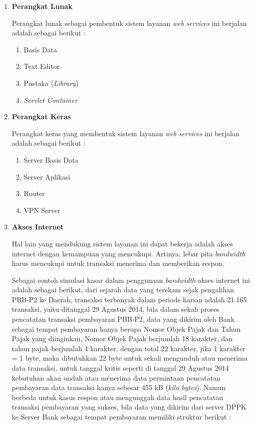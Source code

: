 \documentclass[pdftex,12pt, oneside]{article}
\begin{document}
\begin{enumerate}

\item \textbf{Perangkat Lunak}

Perangkat lunak sebagai pembentuk sistem layanan \textit{web services} ini berjalan adalah sebagai berikut :

\begin{enumerate}
  \item Basis Data
  
  
  
  \item Text Editor 
  \item Pustaka (\textit{Library})
  \item \textit{Servlet Container}
\end{enumerate}

\item \textbf{Perangkat Keras}

Perangkat keras yang membentuk sistem layanan \textit{web services} ini berjalan adalah sebagai berikut :

\begin{enumerate}
  \item Server Basis Data
  \item Server Aplikasi
  \item Router
  \item VPN Server
\end{enumerate}

\item \textbf{Akses Internet}

Hal lain yang mendukung sistem layanan ini dapat bekerja adalah akses internet dengan kemampuan yang mencukupi. Artinya, lebar pita \textit{bandwidth} harus mencukupi untuk transaksi menerima dan memberikan respon.

Sebagai contoh simulasi kasar dalam penggunaan \textit{bandwidth} akses internet ini adalah sebagai berikut, dari sejarah data yang terekam sejak pengalihan PBB-P2 ke Daerah, transaksi terbanyak dalam periode harian adalah 21.165 transaksi, yaitu ditanggal 29 Agustus 2014, bila dalam sekali proses pencatatan transaksi pembayaran PBB-P2, data yang dikirim oleh Bank sebagai tempat pembayaran hanya berupa Nomor Objek Pajak dan Tahun Pajak yang diinginkan, Nomor Objek Pajak berjumlah 18 karakter, dan tahun pajak berjumlah 4 karakter, dengan total 22 karakter, jika 1 karakter = 1 byte, maka dibutuhkan 22 byte untuk sekali mengunduh atau menerima data transaksi, untuk tanggal kritis seperti di tanggal 29 Agustus 2014 kebutuhan akan unduh atau menerima data permintaan pencatatan pembayaran data transaksi hanya sebesar 455 kB (\textit{kilo bytes}). Namun berbeda untuk kasus respon atau mengunggah data hasil pencatatan transaksi pembayaran yang sukses, bila data yang dikirim dari server DPPK ke Server Bank sebagai tempat pembayaran memiliki struktur berikut :


\end{enumerate}
\end{document}
